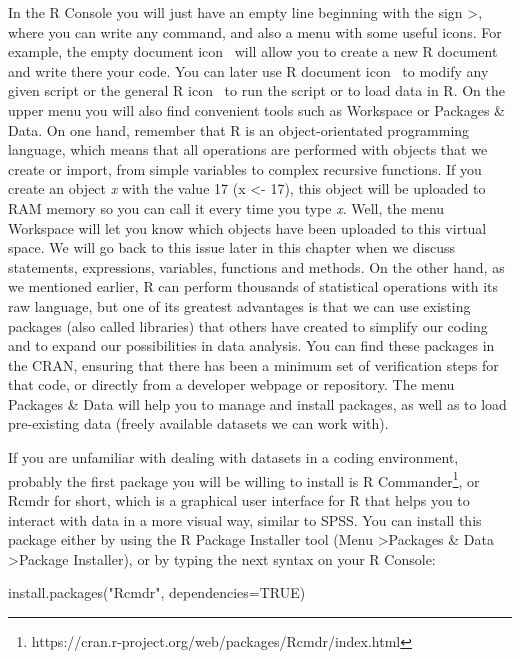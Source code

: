 In the R Console you will just have an empty line beginning with the sign \textgreater, where you can write any command, and also a menu with some useful icons. For example, the empty document icon \icon \  will allow you to create a new R document and write there your code. You can later use R document icon \doc \ to modify any given script or the general R icon \rcom \ to run the script or to load data in R. On the upper menu you will also find convenient tools such as Workspace or Packages \& Data. On one hand, remember that R is an object-orientated programming language, which means that all operations are performed with objects that we create or import, from simple variables to complex recursive functions. If you create an object \emph{x} with the value 17 (x \textless- 17), this object will be uploaded to RAM memory so you can call it every time you type \emph{x}.  Well, the menu Workspace will let you know which objects have been uploaded to this virtual space. We will go back to this issue later in this chapter when we discuss statements, expressions, variables, functions and methods. On the other hand, as we mentioned earlier, R can perform thousands of statistical operations with its raw language, but one of its greatest advantages is that we can use existing packages (also called libraries) that others have created to simplify our coding and to expand our possibilities in data analysis. You can find these packages in the CRAN, ensuring that there has been a minimum set of verification steps for that code, or directly from a developer webpage or repository. The menu Packages \& Data will help you to manage and install packages, as well as to load pre-existing data (freely available datasets we can work with). 

If you are unfamiliar with dealing with datasets in a coding environment, probably the first package you will be willing to install is R Commander\footnote{https://cran.r-project.org/web/packages/Rcmdr/index.html}, or Rcmdr for short, which is a graphical user interface for R that helps you to interact with data in a more visual way, similar to SPSS.	 You can install this package either by using the R Package Installer tool (Menu \textgreater Packages \& Data \textgreater Package Installer), or by typing the next syntax on your R Console:

\begin{exampler}
install.packages("Rcmdr", dependencies=TRUE)
\end{exampler}

